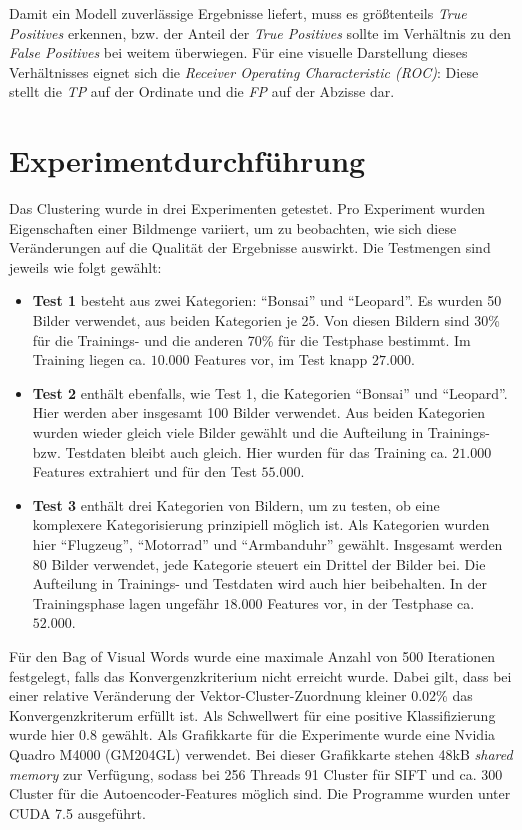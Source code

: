 Damit ein Modell zuverlässige Ergebnisse liefert, muss es größtenteils \textit{True Positives} erkennen, bzw. der Anteil der \textit{True Positives} sollte im Verhältnis zu den \textit{False Positives} bei weitem überwiegen. Für eine visuelle Darstellung dieses Verhältnisses eignet sich die \textit{Receiver Operating Characteristic (ROC)}: Diese stellt die \textit{TP} auf der Ordinate und die \textit{FP} auf der Abzisse dar.

\section{Experimentdurchführung}

Das Clustering wurde in drei Experimenten getestet. Pro Experiment wurden Eigenschaften einer Bildmenge variiert, um zu beobachten, wie sich diese Veränderungen auf die Qualität der Ergebnisse auswirkt. Die Testmengen sind jeweils wie folgt gewählt:

\begin{itemize}
	\item \textbf{Test 1} besteht aus zwei Kategorien: \enquote{Bonsai} und \enquote{Leopard}. Es wurden 50 Bilder verwendet, aus beiden Kategorien je 25. Von diesen Bildern sind 30\% für die Trainings- und die anderen 70\% für die Testphase bestimmt. Im Training liegen ca. $10.000$ Features vor, im Test knapp $27.000$.
	\item \textbf{Test 2} enthält ebenfalls, wie Test 1, die Kategorien \enquote{Bonsai} und \enquote{Leopard}. Hier werden aber insgesamt 100 Bilder verwendet. Aus beiden Kategorien wurden wieder gleich viele Bilder gewählt und die Aufteilung in Trainings- bzw. Testdaten bleibt auch gleich. Hier wurden für das Training ca. $21.000$ Features extrahiert und für den Test $55.000$.
	\item \textbf{Test 3} enthält drei Kategorien von Bildern, um zu testen, ob eine komplexere Kategorisierung prinzipiell möglich ist. Als Kategorien wurden hier \enquote{Flugzeug}, \enquote{Motorrad} und \enquote{Armbanduhr} gewählt. Insgesamt werden 80 Bilder verwendet, jede Kategorie steuert ein Drittel der Bilder bei. Die Aufteilung in Trainings- und Testdaten wird auch hier beibehalten. In der Trainingsphase lagen ungefähr $18.000$ Features vor, in der Testphase ca. $52.000$.
\end{itemize} 

Für den Bag of Visual Words wurde eine maximale Anzahl von 500 Iterationen festgelegt, falls das Konvergenzkriterium nicht erreicht wurde. Dabei gilt, dass bei einer relative Veränderung der Vektor-Cluster-Zuordnung kleiner $0.02$\% das Konvergenzkriterum erfüllt ist. Als Schwellwert für eine positive Klassifizierung wurde hier $0.8$ gewählt.\newline
Als Grafikkarte für die Experimente wurde eine Nvidia Quadro M4000 (GM204GL) verwendet. Bei dieser Grafikkarte stehen 48kB \textit{shared memory} zur Verfügung, sodass bei 256 Threads 91 Cluster für SIFT und ca. 300 Cluster für die Autoencoder-Features möglich sind. Die Programme wurden unter CUDA 7.5 ausgeführt.\newline

